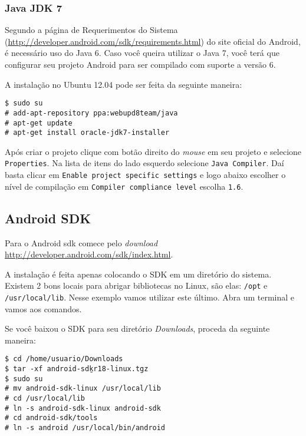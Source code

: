 \subsubsection{Java JDK 7}

Segundo a página de Requerimentos do Sistema (\url{http://developer.android.com/sdk/requirements.html})
do site oficial do Android, é necessário uso do Java 6. Caso você queira utilizar o Java 7, você
terá que configurar seu projeto Android para ser compilado com suporte a versão 6.

A instalação no Ubuntu 12.04 pode ser feita da seguinte maneira:

\begin{flushleft}\texttt{\$ sudo su\\
\# add-apt-repository ppa:webupd8team/java\\
\# apt-get update\\
\# apt-get install oracle-jdk7-installer\\}
\end{flushleft}

Após criar o projeto clique com botão direito do \textit{mouse} em seu projeto e selecione
\texttt{Properties}. Na lista de itens do lado esquerdo selecione \texttt{Java Compiler}. Daí basta clicar
em \texttt{Enable project specific settings} e logo abaixo escolher o nível de compilação em
\texttt{Compiler compliance level} escolha \texttt{1.6}.

\subsection{Android SDK \label{ssec:sdk}}

Para o Android \gls{sdk} comece pelo \textit{download} \url{http://developer.android.com/sdk/index.html}.

A instalação é feita apenas colocando o SDK em um diretório do sistema. Existem 2 bons locais para
abrigar bibliotecas no Linux, são elas: \texttt{/opt} e \texttt{/usr/local/lib}. Nesse exemplo vamos
utilizar este último. Abra um terminal e vamos aos comandos.

Se você baixou o SDK para seu diretório \textit{Downloads}, proceda da seguinte maneira:

\medskip

\begin{flushleft}
\texttt{\$ cd /home/usuario/Downloads \\
\$ tar -xf android-sdk\b{ }r18-linux.tgz \\
\$ sudo su \\
\# mv android-sdk-linux /usr/local/lib \\
\# cd /usr/local/lib \\
\# ln -s android-sdk-linux android-sdk \\
\# cd android-sdk/tools \\
\# ln -s android /usr/local/bin/android \\
}
\end{flushleft}

